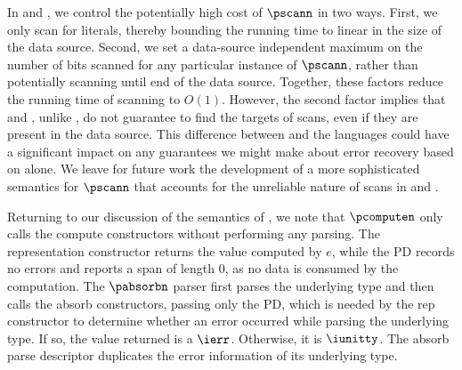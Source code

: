 In \padsc{} and \padsml{}, we control the potentially high cost of
$\pscann$ in two ways. First, we only scan for literals, thereby
bounding the running time to linear in the size of the data source.
Second, we set a data-source independent maximum on the number of bits
scanned for any particular instance of $\pscann$, rather than
potentially scanning until end of the data source. Together, these
factors reduce the running time of scanning to $O(1)$. However, the
second factor implies that \padsc{} and \padsml{}, unlike \ddc{}, do
not guarantee to find the targets of scans, even if they are present
in the data source. This difference between \ddc{} and the \pads{}
languages could have a significant impact on any guarantees we might
make about error recovery based on \ddc{} alone. We leave for future
work the development of a more sophisticated semantics for $\pscann$
that accounts for the unreliable nature of scans in \padsc{} and
\padsml{}.

Returning to our discussion of the semantics of \ddc{}, we note that
$\pcomputen$ only calls the compute constructors without performing
any parsing.  The representation constructor returns the value
computed by $e$, while the PD records no errors and reports a span of
length 0, as no data is consumed by the computation. The $\pabsorbn$
parser first parses the underlying type and then calls the absorb
constructors, passing only the PD, which is needed by the rep
constructor to determine whether an error occurred while parsing the
underlying type.  If so, the value returned is a $\ierr$. Otherwise,
it is $\iunitty$.  The absorb parse descriptor duplicates the error
information of its underlying type.

